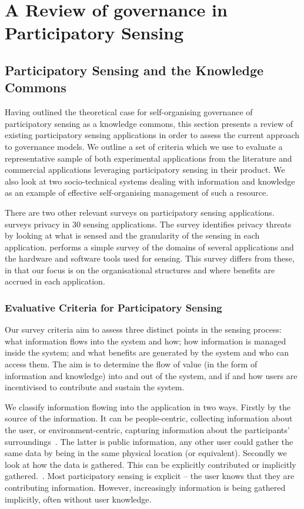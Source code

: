 \acresetall
\chapter{A Review of governance in Participatory Sensing}\label{ch:kc}


\section{Participatory Sensing and the Knowledge Commons}\label{sec:review}

Having outlined the theoretical case for self-organising governance of participatory sensing as a knowledge commons, this section presents a review of existing participatory sensing applications in order to assess the current approach to governance models.  
We outline a set of criteria which we use to evaluate a representative sample of both experimental applications from the literature and commercial applications leveraging participatory sensing in their product. 
We also look at two socio-technical systems dealing with information and knowledge as an example of effective self-organising management of such a resource.

There are two other relevant surveys on participatory sensing applications. 
 surveys privacy in 30 sensing applications. The survey identifies privacy threats by looking at what is sensed and the granularity of the sensing in each application. 
 performs a simple survey of the domains of several applications and the hardware and software tools used for sensing. 
This survey differs from these, in that our focus is on the organisational structures and where benefits are accrued in each application.

\subsection{Evaluative Criteria for Participatory Sensing}

Our survey criteria aim to assess three distinct points in the sensing process: what information flows into the system and how; how information is managed inside the system; and what benefits are generated by the system and who can access them. The aim is to determine the flow of value (in the form of information and knowledge) into and out of the system, and if and how users are incentivised to contribute and sustain the system.

We classify information flowing into the application in two ways. 
Firstly by the source of the information. It can be people-centric, collecting information about the user, or environment-centric, capturing information about the participants' surroundings~\citep{Kanhere2013}. The latter is public information, any other user could gather the same data by being in the same physical location (or equivalent). Secondly we look at how the data is gathered. This can be explicitly contributed or implicitly gathered.~\citep{Shadbolt2013}. Most participatory sensing is explicit -- the user knows that they are contributing information. However, increasingly information is being gathered implicitly, often without user knowledge.


